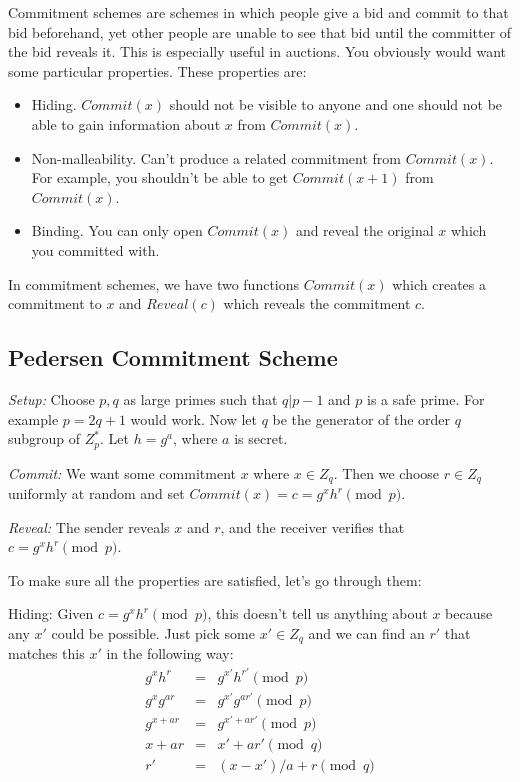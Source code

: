 \documentclass[psamsfonts]{amsart}
\begin{document}
Commitment schemes are schemes in which people give a bid and commit to that bid beforehand, yet other people are unable to see that bid until the committer of the bid reveals it. This is especially useful in auctions. You obviously would want some particular properties. These properties are:
\begin{itemize}
  \item Hiding. $Commit(x)$ should not be visible to anyone and one should not be able to gain information about $x$ from $Commit(x)$.
  \item Non-malleability. Can't produce a related commitment from $Commit(x)$. For example, you shouldn't be able to get $Commit(x+1)$ from $Commit(x)$.
  \item Binding. You can only open $Commit(x)$ and reveal the original $x$ which you committed with.
\end{itemize}

In commitment schemes, we have two functions $Commit(x)$ which creates a commitment to $x$ and $Reveal(c)$ which reveals the commitment $c$.

\subsection{Pedersen Commitment Scheme}

\emph{Setup:} Choose $p,q$ as large primes such that $q | p-1$ and $p$ is a safe prime. For example $p = 2q +1$ would work. Now let $q$ be the generator of the order $q$ subgroup of $Z_p^*$. Let $h = g^a$, where $a$ is secret.

\emph{Commit:} We want some commitment $x$ where $x \in Z_q$. Then we choose $r \in Z_q$ uniformly at random and set $Commit(x) = c = g^x h^r \pmod{p}$.

\emph{Reveal:} The sender reveals $x$ and $r$, and the receiver verifies that $c = g^x h^r \pmod{p}$.

To make sure all the properties are satisfied, let's go through them:

Hiding: Given $c = g^x h^r \pmod{p}$, this doesn't tell us anything about $x$ because any $x'$ could be possible. Just pick some $x' \in Z_q$ and we can find an $r'$ that matches this $x'$ in the following way:
\begin{eqnarray}
  g^{x} h^r &=& g^{x'} h^{r'} \pmod{p} \\
  g^{x} g^{ar} &=& g^{x'} g^{ar'} \pmod{p} \\
    g^{x + ar} &=& g^{x' + ar'} \pmod{p} \\
        x + ar &=& x' + ar' \pmod{q} \\
            r' &=& (x-x')/a + r \pmod{q}
\end{eqnarray}
\end{document}
